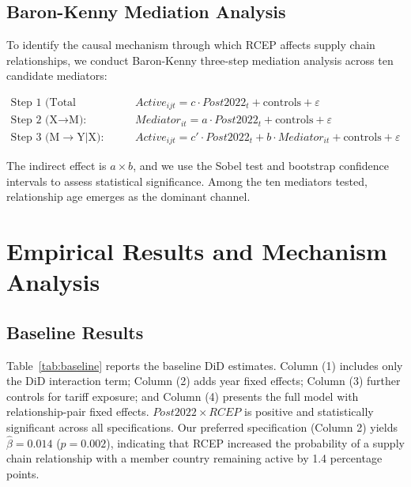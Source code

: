 \documentclass[preprint,12pt,authoryear]{elsarticle}
\begin{document}
\subsection{Baron-Kenny Mediation Analysis}

To identify the causal mechanism through which RCEP affects supply chain relationships, we conduct Baron-Kenny three-step mediation analysis across ten candidate mediators:

\begin{align}
\text{Step 1 (Total Effect):}&\quad Active_{ijt} = c \cdot Post2022_t + \text{controls} + \varepsilon \\
\text{Step 2 (X$\rightarrow$M):}&\quad Mediator_{it} = a \cdot Post2022_t + \text{controls} + \varepsilon \\
\text{Step 3 (M$\rightarrow$Y$|$X):}&\quad Active_{ijt} = c' \cdot Post2022_t + b \cdot Mediator_{it} + \text{controls} + \varepsilon
\end{align}

The indirect effect is $a \times b$, and we use the Sobel test and bootstrap confidence intervals to assess statistical significance. Among the ten mediators tested, relationship age emerges as the dominant channel.

\section{Empirical Results and Mechanism Analysis}
\label{sec:results}

\subsection{Baseline Results}



Table~\ref{tab:baseline} reports the baseline DiD estimates. Column (1) includes only the DiD interaction term; Column (2) adds year fixed effects; Column (3) further controls for tariff exposure; and Column (4) presents the full model with relationship-pair fixed effects. $Post2022 \times RCEP$ is positive and statistically significant across all specifications. Our preferred specification (Column 2) yields $\hat{\beta} = 0.014$ ($p = 0.002$), indicating that RCEP increased the probability of a supply chain relationship with a member country remaining active by 1.4 percentage points.
\end{document}
